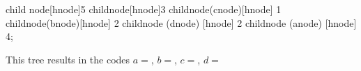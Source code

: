 \begin{Answer}[ref={nuther}]
\begin{huffmanc}

  child {node[hnode]{5}
  child{node[hnode]{3}
  child{node(cnode)[hnode] {1}}
  child{node(bnode)[hnode] {2}}}
  child{node (dnode) [hnode] {2}}}
  child{node (anode) [hnode] {4}};


\end{huffmanc}

This tree results in the codes $a=$, $b=$,
$c=$, $d=$

\end{Answer}